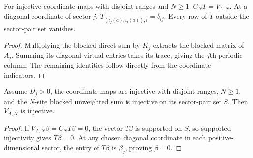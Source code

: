 \begin{lemma}
    \label{thm:ldp_sector_trace_selectors}
    \leanok
    For injective coordinate maps with disjoint ranges and $N\ge1$,
    $C_NT=V_{A,N}$. At a diagonal coordinate of sector $j$,
    $T_{(\iota_j(a),\iota_j(a)),i}=\delta_{ij}$.
    Every row of $T$ outside the sector-pair set vanishes.
\end{lemma}
\begin{proof}\leanok
    Multiplying the blocked direct sum by $K_j$ extracts the blocked
    matrix of $A_j$. Summing its diagonal virtual entries takes its
    trace, giving the $j$th periodic column. The remaining identities
    follow directly from the coordinate indicators.
\end{proof}

\begin{lemma}
    \label{thm:ldp_supported_sector_independence}
    \leanok
    Assume $D_j>0$, the coordinate maps are injective with disjoint ranges,
    $N\ge1$, and the $N$-site blocked unweighted sum is injective on its
    sector-pair set $S$. Then $V_{A,N}$ is injective.
\end{lemma}
\begin{proof}\leanok
    If $V_{A,N}\beta=C_NT\beta=0$, the vector $T\beta$ is supported on
    $S$, so supported injectivity gives $T\beta=0$. At any chosen diagonal
    coordinate in each positive-dimensional sector, the entry of
    $T\beta$ is $\beta_j$, proving $\beta=0$.
\end{proof}

